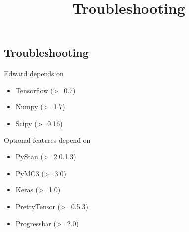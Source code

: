 \title{Troubleshooting}

\subsection{Troubleshooting}

Edward depends on 
\begin{itemize}
  \item Tensorflow (>=0.7)
  \item Numpy (>=1.7)
  \item Scipy (>=0.16)
\end{itemize}

Optional features depend on
\begin{itemize}
  \item PyStan (>=2.0.1.3)
  \item PyMC3 (>=3.0)
  \item Keras (>=1.0)
  \item PrettyTensor (>=0.5.3)
  \item Progressbar (>=2.0)
\end{itemize}
